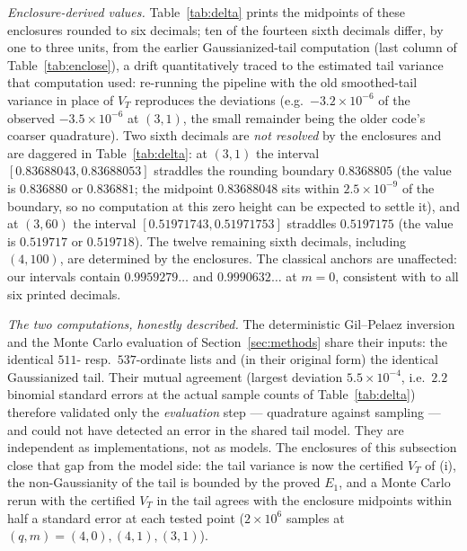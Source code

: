 \documentclass[11pt]{article}
\begin{document}
\emph{Enclosure-derived values.} Table~\ref{tab:delta} prints the
midpoints of these enclosures rounded to six decimals; ten of the
fourteen sixth decimals differ, by one to three units, from the
earlier Gaussianized-tail computation (last column of
Table~\ref{tab:enclose}), a drift quantitatively traced to the
estimated tail variance that computation used: re-running the pipeline
with the old smoothed-tail variance in place of $V_T$ reproduces the
deviations (e.g.\ $-3.2\times10^{-6}$ of the observed
$-3.5\times10^{-6}$ at $(3,1)$, the small remainder being the older
code's coarser quadrature). Two sixth decimals are \emph{not resolved}
by the enclosures and are daggered in Table~\ref{tab:delta}: at
$(3,1)$ the interval $[0.83688043,0.83688053]$ straddles the rounding
boundary $0.8368805$ (the value is $0.836880$ or $0.836881$; the
midpoint $0.83688048$ sits within $2.5\times10^{-9}$ of the boundary,
so no computation at this zero height can be expected to settle it),
and at $(3,60)$ the interval $[0.51971743,0.51971753]$ straddles
$0.5197175$ (the value is $0.519717$ or $0.519718$). The twelve
remaining sixth decimals, including $(4,100)$, are determined by the
enclosures. The classical anchors are unaffected: our intervals
contain $0.9959279\ldots$ and $0.9990632\ldots$ at $m=0$, consistent
with \cite{RS94,FM13} to all six printed decimals.

\emph{The two computations, honestly described.} The deterministic
Gil--Pelaez inversion and the Monte Carlo evaluation of
Section~\ref{sec:methods} share their inputs: the identical
$511$- resp.\ $537$-ordinate lists and (in their original form) the
identical Gaussianized tail. Their mutual agreement (largest deviation
$5.5\times10^{-4}$, i.e.\ $2.2$ binomial standard errors at the actual
sample counts of Table~\ref{tab:delta}) therefore validated only the
\emph{evaluation} step ---
quadrature against sampling --- and could not have detected an error in
the shared tail model. They are independent as implementations, not as
models. The enclosures of this subsection close that gap from the model
side: the tail variance is now the certified $V_T$ of (i), the
non-Gaussianity of the tail is bounded by the proved $E_1$, and a
Monte Carlo rerun with the certified $V_T$ in the tail agrees with the
enclosure midpoints within half a standard error at each tested point
($2\times10^6$ samples at $(q,m)=(4,0),(4,1),(3,1)$).
\end{document}
